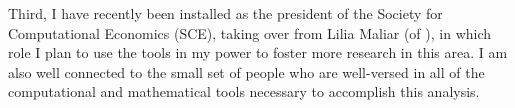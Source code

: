 \documentclass[11pt,pdftex,letterpaper]{article}
\begin{document}
Third, I have recently been installed as the president of the Society for Computational Economics (SCE), taking over from Lilia Maliar (of \cite{MALIAR202176}), in which role I plan to use the tools in my power to foster more research in this area.  I am also well connected to the small set of people who are well-versed in all of the computational and mathematical tools necessary to accomplish this analysis.

\nocite{HARK}
\pagebreak\newpage




\newpage

\begin{singlespace}
    
	
\end{singlespace}
\end{document}

